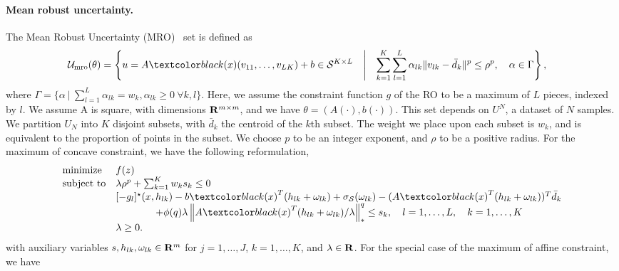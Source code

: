 \paragraph{Mean robust uncertainty.}
The Mean Robust Uncertainty (MRO)~\citep{mro} set
is defined as
\begin{equation*}
	\begin{aligned}
		\uncset_{\text{mro}}(\theta) & = \left\{ u = A\RC{(x)}(v_{11},\dots,v_{LK})+ b\in \supp^{K\times L} \quad\middle|\quad \sum_{k=1}^K \sum_{l=1}^L \alpha_{lk} \| v_{lk} - \bar{d}_k \|^p \le \rho^p,\quad \alpha \in \Gamma \right\},
	\end{aligned}
\end{equation*}
where $\Gamma = \{\alpha~|~\sum_{l=1}^L\alpha_{lk}= w_k, \alpha_{lk}\geq 0 ~\forall k,l\}$. 
Here, we assume the constraint function $g$ of the \gls{RO} to be a maximum of $L$ pieces, indexed by $l$. 
We assume A is square, with dimensions ${\mathbf R}^{m\times m}$, and we have $\theta = (A(\cdot), b(\cdot))$. 
This set depends on $U^N$, a dataset of $N$ samples.
We partition ${U}_N$ into $K$ disjoint subsets, with $\bar{d}_k$ the centroid of the $k$th subset. The weight we place upon each subset is $w_k$, and is equivalent to the proportion of points in the subset. We choose $p$ to be an integer exponent, and $\rho$ to be a positive radius. 
For the maximum of concave constraint, we have the following reformulation,
\begin{equation*}
	\begin{aligned}
	\begin{array}{ll}
	{\text{minimize}} & f(z)\\
	\mbox{subject to} &\lambda \rho^p + \sum_{k=1}^K w_k s_k \leq 0\\
	 & [-g_l]^\star(x,h_{lk}) -b\RC{(x)}^T(h_{lk} + \omega_{lk}) + \sigma_\supp(\omega_{lk}) - (A\RC{(x)}^T(h_{lk} + \omega_{lk}))^T \bar{d}_k \\
& \qquad \qquad + \phi(q)\lambda \left\|A\RC{(x)}^T(h_{lk} + \omega_{lk})/\lambda \right\|^q_* \le s_k,\quad  l = 1,\dots,L, \quad k = 1,\dots,K\\
& \lambda \geq 0.
	\end{array}
	\end{aligned}
	\end{equation*}
with auxiliary variables  $s, h_{lk}, \omega_{lk} \in {\mathbf R}^m$ for $j = 1,\dots,J$, $k = 1,\dots, K$, and $\lambda \in {\mathbf R}$. For the special case of the maximum of affine constraint, we have
